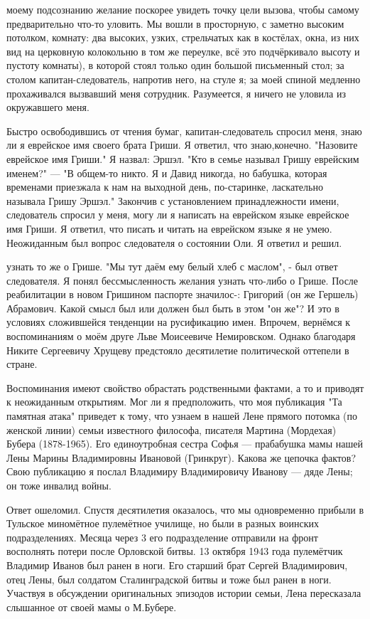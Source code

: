 \label{258-1}
моему подсознанию желание поскорее увидеть точку цели вызова, чтобы самому предварительно что-то уловить. Мы вошли в просторную, с заметно высоким потолком, комнату: два высоких, узких, стрельчатых как в костёлах, окна, из них вид на церковную колокольню в том же переулке, всё это подчёркивало высоту и пустоту комнаты), в которой стоял только один большой письменный стол; за столом капитан-следователь, напротив него, на стуле я; за моей спиной медленно прохаживался вызвавший меня сотрудник. Разумеется, я ничего не уловила из окружавшего меня.

\label{259-1}
Быстро освободившись от чтения бумаг, капитан-следователь спросил меня, знаю ли я еврейское имя своего брата Гриши. Я ответил, что знаю,конечно. "Назовите еврейское имя Гриши." Я назвал: Эршэл. "Кто в семье называл Гришу еврейским именем?" — "В общем-то никто. Я и Давид никогда, но бабушка, которая временами приезжала к нам на выходной день, по-старинке, ласкательно называла Гришу Эршэл." Закончив с установлением принадлежности имени, следователь спросил у меня, могу ли я написать на еврейском языке еврейское имя Гриши. Я ответил, что писать и читать на еврейском языке я не умею. Неожиданным был вопрос следователя о состоянии Оли. Я ответил и решил.

\label{260-1}
узнать то же о Грише. "Мы тут даём ему белый хлеб с маслом", - был ответ следователя. Я понял бессмысленность желания узнать что-либо о Грише. 
После реабилитации в новом Гришином паспорте значилос-: Григорий (он же Гершель) Абрамович. Какой смысл был или должен был быть в этом "он же"? И это в условиях сложившейся тенденции на русификацию имен. Впрочем, вернёмся к воспоминаниям о моём друге Льве Моисеевиче Немировском. Однако благодаря Никите Сергеевичу Хрущеву предстояло десятилетие политической оттепели в стране.

\label{261-1}
Воспоминания имеют свойство обрастать родственными фактами, а то и приводят к неожиданным открытиям. Мог ли я предположить, что моя публикация "Та памятная атака" приведет к тому, что узнаем в нашей Лене прямого потомка (по женской линии) семьи известного философа, писателя Мартина (Мордехая) Бубера (1878-1965). Его единоутробная сестра Софья — прабабушка мамы нашей Лены Марины Владимировны Ивановой (Гринкруг). Какова же цепочка фактов? Свою публикацию я послал Владимиру Владимировичу Иванову — дяде Лены; он тоже инвалид войны.

\label{262-1}
Ответ ошеломил. Спустя десятилетия оказалось, что мы одновременно прибыли в Тульское миномётное пулемётное училище, но были в разных воинских подразделениях. Месяца через 3 его подразделение отправили на фронт восполнять потери после Орловской битвы. 13 октября 1943 года пулемётчик Владимир Иванов был ранен в ноги. Его старший брат Сергей Владимирович, отец Лены, был солдатом Сталинградской битвы и тоже был ранен в ноги. Участвуя в обсуждении оригинальных эпизодов истории семьи, Лена пересказала слышанное от своей мамы о М.Бубере.


